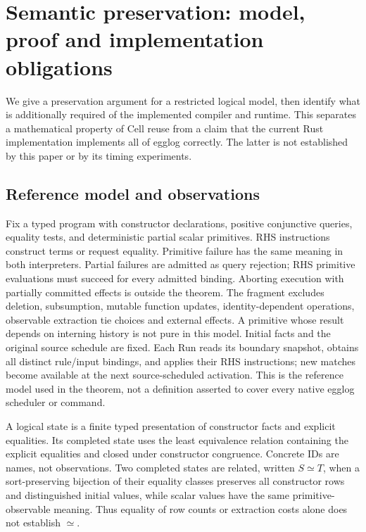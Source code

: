 \section{Semantic preservation: model, proof and implementation obligations}\label{sec:semantics}
We give a preservation argument for a restricted logical model, then identify
what is additionally required of the implemented compiler and runtime. This
separates a mathematical property of Cell reuse from a claim that the current
Rust implementation implements all of egglog correctly. The latter is not
established by this paper or by its timing experiments.

\subsection{Reference model and observations}
Fix a typed program with constructor declarations, positive conjunctive queries,
equality tests, and deterministic partial scalar primitives. RHS instructions
construct terms or request equality. Primitive failure has the same meaning in
both interpreters. Partial failures are admitted as query rejection; RHS primitive
evaluations must succeed for every admitted binding. Aborting execution with
partially committed effects is outside the theorem. The fragment excludes deletion, subsumption, mutable function
updates, identity-dependent operations, observable extraction tie choices and
external effects. A primitive whose result depends on interning history is not
pure in this model. Initial facts and the original source schedule are fixed.
Each Run reads its boundary snapshot, obtains all distinct rule/input bindings,
and applies their RHS instructions; new matches become available at the next
source-scheduled activation. This is the reference model used in the theorem,
not a definition asserted to cover every native egglog scheduler or command.

A logical state is a finite typed presentation of constructor facts and explicit
equalities. Its completed state uses the least equivalence relation containing
the explicit equalities and closed under constructor congruence. Concrete IDs
are names, not observations. Two completed states are related, written
$S\simeq T$, when a sort-preserving bijection of their equality classes preserves
all constructor rows and distinguished initial values, while scalar values
have the same primitive-observable meaning. Thus equality of row counts or
extraction costs alone does not establish $\simeq$.

